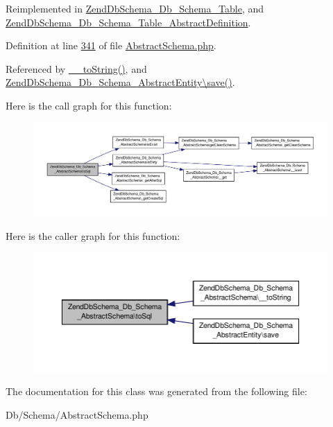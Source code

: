Reimplemented in \hyperlink{classZendDbSchema__Db__Schema__Table_a6178edaeea7e08d97e2196dd991532f9}{Zend\-Db\-Schema\-\_\-\-Db\-\_\-\-Schema\-\_\-\-Table}, and \hyperlink{classZendDbSchema__Db__Schema__Table__AbstractDefinition_a75c1b3ef1005c2d6aa371ecef07d530d}{Zend\-Db\-Schema\-\_\-\-Db\-\_\-\-Schema\-\_\-\-Table\-\_\-\-Abstract\-Definition}.



Definition at line \hyperlink{AbstractSchema_8php_source_l00341}{341} of file \hyperlink{AbstractSchema_8php_source}{Abstract\-Schema.\-php}.



Referenced by \hyperlink{AbstractSchema_8php_source_l00181}{\-\_\-\-\_\-to\-String()}, and \hyperlink{AbstractEntity_8php_source_l00169}{Zend\-Db\-Schema\-\_\-\-Db\-\_\-\-Schema\-\_\-\-Abstract\-Entity\textbackslash{}save()}.



Here is the call graph for this function\-:\nopagebreak
\begin{figure}[H]
\begin{center}
\leavevmode
\includegraphics[width=350pt]{classZendDbSchema__Db__Schema__AbstractSchema_ada5af8e6e7a4c5407b7ca67d03900b31_cgraph}
\end{center}
\end{figure}




Here is the caller graph for this function\-:\nopagebreak
\begin{figure}[H]
\begin{center}
\leavevmode
\includegraphics[width=350pt]{classZendDbSchema__Db__Schema__AbstractSchema_ada5af8e6e7a4c5407b7ca67d03900b31_icgraph}
\end{center}
\end{figure}




The documentation for this class was generated from the following file\-:\begin{DoxyCompactItemize}
\item 
Db/\-Schema/Abstract\-Schema.\-php\end{DoxyCompactItemize}
